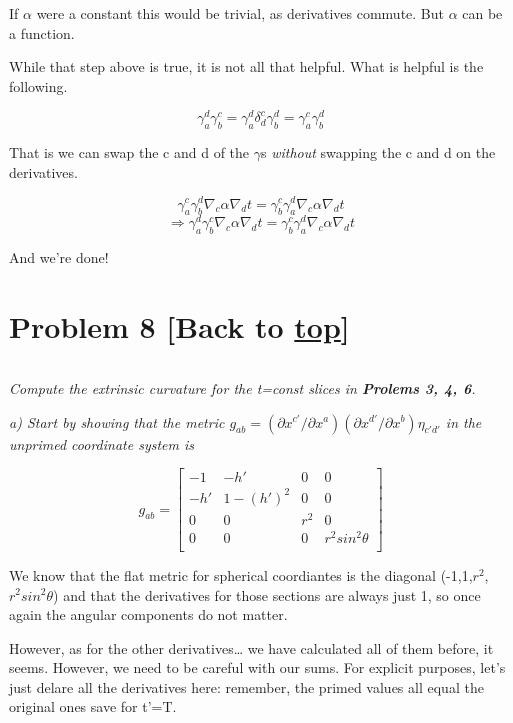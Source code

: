 \documentclass[landscape,letterpaper,10pt,english]{article}
\begin{document}
If \(\alpha\) were a constant this would be trivial, as derivatives
commute. But \(\alpha\) can be a function.

While that step above is true, it is not all that helpful. What is
helpful is the following.

\[ \gamma^d_a\gamma^c_b = \gamma^d_a\delta^c_d\gamma^d_b = \gamma^c_a\gamma^d_b\]

That is we can swap the c and d of the \(\gamma\)s \emph{without}
swapping the c and d on the derivatives.

\[\gamma^c_a\gamma^d_b\nabla_c \alpha \nabla_d t = \gamma^c_b\gamma^d_a\nabla_c \alpha \nabla_d t \]
\[\Rightarrow \gamma^d_a\gamma^c_b\nabla_c \alpha \nabla_d t = \gamma^c_b\gamma^d_a\nabla_c \alpha \nabla_d t \]

And we're done!

    \hypertarget{problem-8-back-to-top}{%
\section{\texorpdfstring{Problem 8 {[}Back to
\hyperref[toc]{top}{]}}{Problem 8 {[}Back to {]}}}\label{problem-8-back-to-top}}

\[\label{P8}\]

\emph{Compute the extrinsic curvature for the t=const slices in
\textbf{Prolems 3, 4, 6}.}

\emph{a) Start by showing that the metric
\(g_{ab} = (\partial x^{c'}/\partial x^{a})(\partial x^{d'}/\partial x^b)\eta_{c'd'}\)
in the unprimed coordinate system is}

\[ g_{ab} = \begin{bmatrix}
-1 & -h' & 0 & 0 \\
-h' & 1-(h')^2 & 0 & 0 \\
0 & 0 & r^2 & 0 \\
0 & 0 & 0 & r^2sin^2\theta \\
\end{bmatrix}\]

    We know that the flat metric for spherical coordiantes is the diagonal
(-1,1,\(r^2\),\(r^2sin^2\theta\)) and that the derivatives for those
sections are always just 1, so once again the angular components do not
matter.

However, as for the other derivatives\ldots{} we have calculated all of
them before, it seems. However, we need to be careful with our sums. For
explicit purposes, let's just delare all the derivatives here: remember,
the primed values all equal the original ones save for t'=T.
\end{document}
